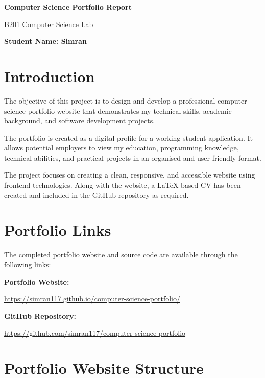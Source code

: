 \documentclass[12pt,a4paper]{article}
\begin{document}
\begin{center}

{\Huge \textbf{Computer Science Portfolio Report}}

\vspace{10pt}

{\large B201 Computer Science Lab}

\vspace{10pt}

\textbf{Student Name: Simran}

\end{center}




\section{Introduction}


The objective of this project is to design and develop a professional computer science portfolio website that demonstrates my technical skills, academic background, and software development projects.

The portfolio is created as a digital profile for a working student application. It allows potential employers to view my education, programming knowledge, technical abilities, and practical projects in an organised and user-friendly format.

The project focuses on creating a clean, responsive, and accessible website using frontend technologies. Along with the website, a LaTeX-based CV has been created and included in the GitHub repository as required.



\section{Portfolio Links}


The completed portfolio website and source code are available through the following links:


\textbf{Portfolio Website:}

\url{https://simran117.github.io/computer-science-portfolio/}


\vspace{8pt}


\textbf{GitHub Repository:}

\url{https://github.com/simran117/computer-science-portfolio}




\section{Portfolio Website Structure}
\end{document}
